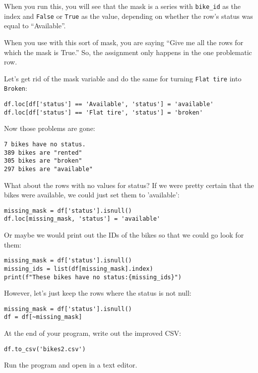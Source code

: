 When you run this, you will see that the mask is a series with
\texttt{bike\_id} as the index and \texttt{False} or \texttt{True} as the value,
depending on whether the row's status was equal to ``Available''.

When you use  with this sort of mask, you are saying
``Give me all the rows for which the mask is True.''  So, the
assignment only happens in the one problematic row.

Let's get rid of the mask variable and do the same for turning \texttt{Flat tire} into \texttt{Broken}:

\begin{Verbatim}
df.loc[df['status'] == 'Available', 'status'] = 'available'
df.loc[df['status'] == 'Flat tire', 'status'] = 'broken'
\end{Verbatim}

Now those problems are gone:
\begin{Verbatim}
7 bikes have no status.
389 bikes are "rented"
305 bikes are "broken"
297 bikes are "available"
\end{Verbatim}

What about the rows with no values for status? If we were pretty certain
that the bikes were available, we could just set them to 'available':

\begin{Verbatim}
missing_mask = df['status'].isnull()
df.loc[missing_mask, 'status'] = 'available'
\end{Verbatim}

Or maybe we would print out the IDs of the bikes so that we could go look for them:

\begin{Verbatim}
missing_mask = df['status'].isnull()
missing_ids = list(df[missing_mask].index)
print(f"These bikes have no status:{missing_ids}")
\end{Verbatim}

However, let's just keep the rows where the status is not null:
\begin{Verbatim}
missing_mask = df['status'].isnull()
df = df[~missing_mask]
\end{Verbatim}

At the end of your program, write out the improved CSV:

\begin{Verbatim}
df.to_csv('bikes2.csv')
\end{Verbatim}

Run the program and open  in a text editor.

